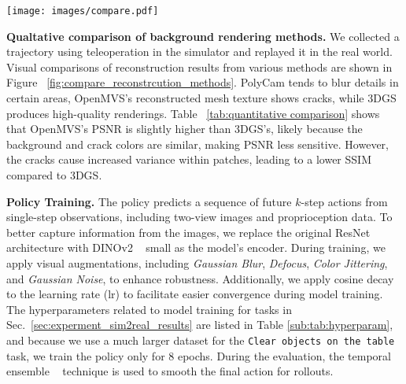 \begin{figure*}[h]
    \centering
    \texttt{[image: images/compare.pdf]}
    \caption{\textbf{Visual comparison of rendering approaches.} Rendering results of reconstruction outputs from PolyCam, OpenMVS, and 3DGS, compared with real-world photos. }
    \label{fig:compare_reconstrcution_methods}
\end{figure*}
\noindent\textbf{Qualtative comparison of background rendering methods.}
We collected a trajectory using teleoperation in the simulator and replayed it in the real world. Visual comparisons of reconstruction results from various methods are shown in Figure ~\ref{fig:compare_reconstrcution_methods}. PolyCam tends to blur details in certain areas, OpenMVS's reconstructed mesh texture shows cracks, while 3DGS produces high-quality renderings. Table ~\ref{tab:quantitative comparison} shows that OpenMVS's PSNR is slightly higher than 3DGS's, likely because the background and crack colors are similar, making PSNR less sensitive. However, the cracks cause increased variance within patches, leading to a lower SSIM compared to 3DGS.


\noindent\textbf{Policy Training.} The policy predicts a sequence of future $k$-step actions from single-step observations, including two-view images and proprioception data. To better capture information from the images, we replace the original ResNet architecture with DINOv2 ~\citep{oquab2023dinov2} small as the model's encoder. 
During training, we apply visual augmentations, including \textit{Gaussian Blur}, \textit{Defocus}, \textit{Color Jittering}, and \textit{Gaussian Noise}, to enhance robustness. Additionally, we apply cosine decay to the learning rate (lr) to facilitate easier convergence during model training. The hyperparameters related to model training for tasks in Sec.~\ref{sec:experment_sim2real_results} are listed in Table \ref{sub:tab:hyperparam}, and because we use a much larger dataset for the \texttt{Clear objects on the table} task, we train the policy only for 8 epochs. During the evaluation, the temporal ensemble ~\citep{zhao2023learning} technique is used to smooth the final action for rollouts.


